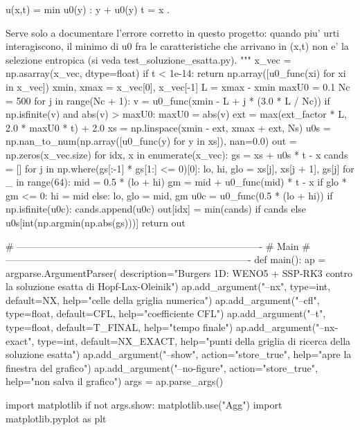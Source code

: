 \documentclass[12pt]{article}
\begin{document}
\begin{pythoncode}[title=Implementazione WENO]
        u(x,t) = min{ u0(y) : y + u0(y) t = x }.

    Serve solo a documentare l'errore corretto in questo progetto: quando piu'
    urti interagiscono, il minimo di u0 fra le caratteristiche che arrivano in
    (x,t) non e' la selezione entropica (si veda test_soluzione_esatta.py).
    """
    x_vec = np.asarray(x_vec, dtype=float)
    if t < 1e-14:
        return np.array([u0_func(xi) for xi in x_vec])
    xmin, xmax = x_vec[0], x_vec[-1]
    L = xmax - xmin
    maxU0 = 0.1
    Nc = 500
    for j in range(Nc + 1):
        v = u0_func(xmin - L + j * (3.0 * L / Nc))
        if np.isfinite(v) and abs(v) > maxU0:
            maxU0 = abs(v)
    ext = max(ext_factor * L, 2.0 * maxU0 * t) + 2.0
    xs = np.linspace(xmin - ext, xmax + ext, Ns)
    u0s = np.nan_to_num(np.array([u0_func(y) for y in xs]), nan=0.0)
    out = np.zeros(x_vec.size)
    for idx, x in enumerate(x_vec):
        gs = xs + u0s * t - x
        cands = []
        for j in np.where(gs[:-1] * gs[1:] <= 0)[0]:
            lo, hi, glo = xs[j], xs[j + 1], gs[j]
            for _ in range(64):
                mid = 0.5 * (lo + hi)
                gm = mid + u0_func(mid) * t - x
                if glo * gm <= 0:
                    hi = mid
                else:
                    lo, glo = mid, gm
            u0c = u0_func(0.5 * (lo + hi))
            if np.isfinite(u0c):
                cands.append(u0c)
        out[idx] = min(cands) if cands else u0s[int(np.argmin(np.abs(gs)))]
    return out


# ----------------------------------------------------------------------------
# Main
# ----------------------------------------------------------------------------
def main():
    ap = argparse.ArgumentParser(
        description="Burgers 1D: WENO5 + SSP-RK3 contro la soluzione esatta di Hopf-Lax-Oleinik")
    ap.add_argument("--nx", type=int, default=NX, help="celle della griglia numerica")
    ap.add_argument("--cfl", type=float, default=CFL, help="coefficiente CFL")
    ap.add_argument("--t", type=float, default=T_FINAL, help="tempo finale")
    ap.add_argument("--nx-exact", type=int, default=NX_EXACT,
                    help="punti della griglia di ricerca della soluzione esatta")
    ap.add_argument("--show", action="store_true", help="apre la finestra del grafico")
    ap.add_argument("--no-figure", action="store_true", help="non salva il grafico")
    args = ap.parse_args()

    import matplotlib
    if not args.show:
        matplotlib.use("Agg")
    import matplotlib.pyplot as plt


\end{pythoncode}
\end{document}
